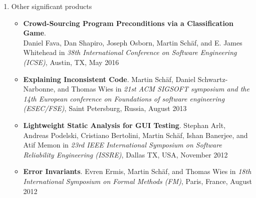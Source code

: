 \documentclass{article}
\begin{document}
\begin{enumerate}
\begin{itemize}
                                                                                


%
%
\end{itemize}



\item
Other significant products

\begin{itemize}

\item \textbf{Crowd-Sourcing Program Preconditions via a Classification Game}.
\\ Daniel Fava, Dan Shapiro, Joseph Osborn, Martin Sch\"af, and E. James
Whitehead in \emph{38th International Conference on Software Engineering (ICSE)}, Austin,
TX, May 2016

\item \textbf{Explaining Inconsistent Code}.  
Martin Sch\"af, Daniel Schwartz-Narbonne, and Thomas Wies in \emph{21st ACM
SIGSOFT symposium and the 14th European conference on Foundations of software
engineering (ESEC/FSE)}, Saint Petersburg, Russia, August 2013
  
\item \textbf{Lightweight Static Analysis for GUI Testing}. Stephan
Arlt, Andreas Podelski, Cristiano Bertolini, Martin Sch\"af, Ishan Banerjee, and
Atif Memon in \emph{ 23rd IEEE International Symposium on Software Reliability
Engineering (ISSRE)}, Dallas TX, USA, November 2012

\item \textbf{Error Invariants}. Evren Ermis, Martin Sch\"af, and Thomas Wies in
\emph{18th International Symposium on Formal Methods (FM)}, Paris, France,
August 2012

\end{itemize}
\end{enumerate}
\end{document}
